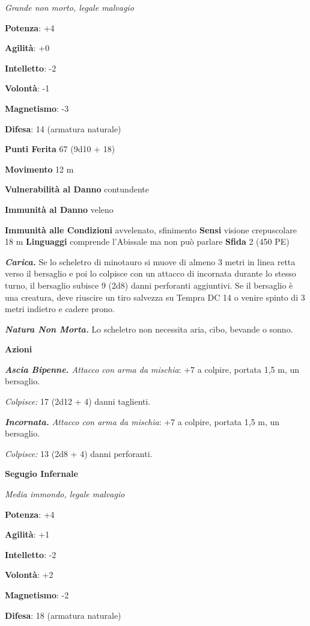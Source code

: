 \begin{multicols}{2}
\emph{Grande non morto, legale malvagio}

\textbf{Potenza}: +4

\textbf{Agilità}: +0

\textbf{Intelletto}: -2

\textbf{Volontà}: -1

\textbf{Magnetismo}: -3

\textbf{Difesa}: 14 (armatura naturale)

\textbf{Punti Ferita} 67 (9d10 + 18)

\textbf{Movimento} 12 m

\textbf{Vulnerabilità al Danno} contundente

\textbf{Immunità al Danno} veleno

\textbf{Immunità alle Condizioni} avvelenato, sfinimento \textbf{Sensi}
visione crepuscolare 18 m \textbf{Linguaggi} comprende
l'Abissale ma non può parlare \textbf{Sfida} 2 (450 PE)

\emph{\textbf{Carica.}} Se lo scheletro di minotauro si muove di almeno
3 metri in linea retta verso il bersaglio e poi lo colpisce con un
attacco di incornata durante lo stesso turno, il bersaglio subisce 9
(2d8) danni perforanti aggiuntivi. Se il bersaglio è una creatura, deve
riuscire un tiro salvezza su Tempra DC 14 o venire spinto di 3 metri
indietro e cadere prono.

\emph{\textbf{Natura Non Morta.}} Lo scheletro non necessita aria, cibo,
bevande o sonno.

\textbf{Azioni}

\emph{\textbf{Ascia Bipenne.} Attacco con arma da mischia}: +7 a
colpire, portata 1,5 m, un bersaglio.

\emph{Colpisce:} 17 (2d12 + 4) danni taglienti.

\emph{\textbf{Incornata.} Attacco con arma da mischia}: +7 a colpire,
portata 1,5 m, un bersaglio.

\emph{Colpisce:} 13 (2d8 + 4) danni perforanti.

\textbf{Segugio Infernale}

\emph{Media immondo, legale malvagio}

\textbf{Potenza}: +4

\textbf{Agilità}: +1

\textbf{Intelletto}: -2

\textbf{Volontà}: +2

\textbf{Magnetismo}: -2

\textbf{Difesa}: 18 (armatura naturale)


\end{multicols}
